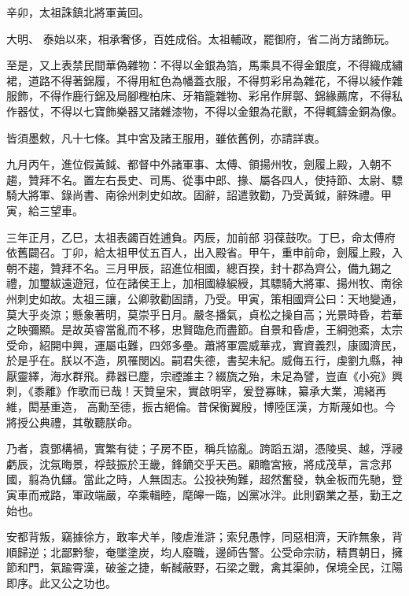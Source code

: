 \begin{pinyinscope}
 辛卯，太祖誅鎮北將軍黃回。



 大明、
 泰始以來，相承奢侈，百姓成俗。太祖輔政，罷御府，省二尚方諸飾玩。



 至是，又上表禁民間華偽雜物：不得以金銀為箔，馬乘具不得金銀度，不得織成繡裙，道路不得著錦履，不得用紅色為幡蓋衣服，不得剪彩帛為雜花，不得以綾作雜服飾，不得作鹿行錦及局腳檉柏床、牙箱籠雜物、彩帛作屏鄣、錦緣薦席，不得私作器仗，不得以七寶飾樂器又諸雜漆物，不得以金銀為花獸，不得輒鑄金銅為像。



 皆須墨敕，凡十七條。其中宮及諸王服用，雖依舊例，亦請詳衷。



 九月丙午，進位假黃鉞、都督中外諸軍事、太傅、領揚州牧，劍履上殿，入朝不趨，贊拜不名。置左右長史、司馬、從事中郎、掾、屬各四人，使持節、太尉、驃騎大將軍、錄尚書、南徐州刺史如故。固辭，詔遣敦勸，乃受黃鉞，辭殊禮。甲寅，給三望車。



 三年正月，乙巳，太祖表蠲百姓逋負。丙辰，加前部
 羽葆鼓吹。丁巳，命太傅府依舊闢召。丁卯，給太祖甲仗五百人，出入殿省。甲午，重申前命，劍履上殿，入朝不趨，贊拜不名。三月甲辰，詔進位相國，總百揆，封十郡為齊公，備九錫之禮，加璽紱遠遊冠，位在諸侯王上，加相國綠綟綬，其驃騎大將軍、揚州牧、南徐州刺史如故。太祖三讓，公卿敦勸固請，乃受。甲寅，策相國齊公曰：天地變通，莫大乎炎涼；懸象著明，莫崇乎日月。嚴冬播氣，貞松之操自高；光景時昏，若華之映彌顯。是故英睿當亂而不移，忠賢臨危而盡節。自景和昏虐，王綱弛紊，太宗受命，紹開中興，運屬屯難，四郊多壘。蕭將軍震威華戎，實資義烈，康國濟民，於是乎在。朕以不造，夙罹閔凶。嗣君失德，書契未紀。威侮五行，虔劉九縣，神厭靈繹，海水群飛。彞器已塵，宗禋誰主？綴旒之殆，未足為譬，豈直《小宛》興刺，《黍離》作歌而已哉！天贊皇宋，實啟明宰，爰登寡昧，纂承大業，鴻緒再維，閎基重造，
 高勳至德，振古絕倫。昔保衡翼殷，博陸匡漢，方斯蔑如也。今將授公典禮，其敬聽朕命。



 乃者，袁鄧構禍，實繁有徒；子房不臣，稱兵協亂。跨蹈五湖，憑陵吳、越，浮祲虧辰，沈氛晦景，桴鼓振於王畿，鋒鏑交乎天邑。顧瞻宮掖，將成茂草，言念邦國，翦為仇讎。當此之時，人無固志。公投袂殉難，超然奮發，執金板而先馳，登寅車而戒路，軍政端嚴，卒乘輯睦，麾皞一臨，凶黨冰泮。此則霸業之基，勤王之始也。



 安都背叛，竊據徐方，敢率犬羊，陵虐淮滸；索兒愚悖，同惡相濟，天祚無象，背順歸逆；北鄙黔黎，奄墜塗炭，均人廢職，邊師告警。公受命宗祊，精貫朝日，擁節和門，氣踰霄漢，破釜之捷，斬馘蔽野，石梁之戰，禽其渠帥，保境全民，江陽即序。此又公之功也。




\end{pinyinscope}
